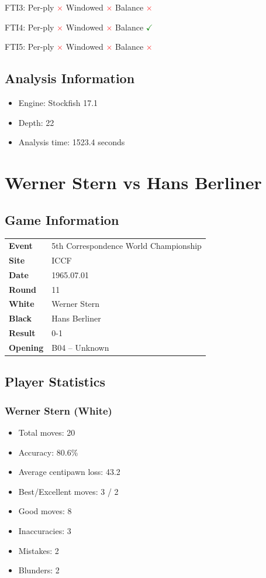 \documentclass[11pt]{book}
\begin{document}
FTI3: Per-ply \textcolor{red}{$\times$} \quad Windowed \textcolor{red}{$\times$} \quad Balance \textcolor{red}{$\times$}

FTI4: Per-ply \textcolor{red}{$\times$} \quad Windowed \textcolor{red}{$\times$} \quad Balance \textcolor{green}{$\checkmark$}

FTI5: Per-ply \textcolor{red}{$\times$} \quad Windowed \textcolor{red}{$\times$} \quad Balance \textcolor{red}{$\times$}

\section{Analysis Information}
\begin{itemize}
\item Engine: Stockfish 17.1
\item Depth: 22
\item Analysis time: 1523.4 seconds
\end{itemize}

\chapter{Werner Stern vs Hans Berliner}

\section{Game Information}
\begin{tabular}{ll}
\textbf{Event} & 5th Correspondence World Championship \\
\textbf{Site} & ICCF \\
\textbf{Date} & 1965.07.01 \\
\textbf{Round} & 11 \\
\textbf{White} & Werner Stern \\
\textbf{Black} & Hans Berliner \\
\textbf{Result} & 0-1 \\
\textbf{Opening} & B04 -- Unknown \\
\end{tabular}

\section{Player Statistics}

\subsection{Werner Stern (White)}
\begin{itemize}
\item Total moves: 20
\item Accuracy: 80.6\%
\item Average centipawn loss: 43.2
\item Best/Excellent moves: 3 / 2
\item Good moves: 8
\item Inaccuracies: 3
\item Mistakes: 2
\item Blunders: 2
\end{itemize}
\end{document}
